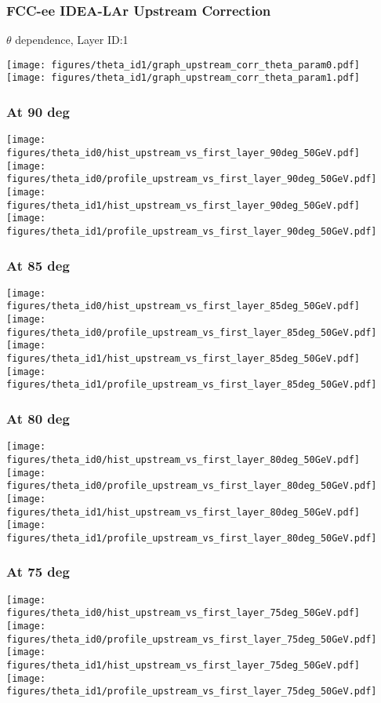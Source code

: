 \documentclass{beamer}
\newcommand{\redtext}[1]{%
  \textcolor{myRed}{#1}
}
\begin{document}
\begin{frame}
  \frametitle{FCC-ee IDEA-LAr Upstream Correction}

  \begin{center}
    $\theta$ dependence, Layer \redtext{ID:\@ 1}
  \end{center}

  \texttt{[image: figures/theta\_id1/graph\_upstream\_corr\_theta\_param0.pdf]}
  \texttt{[image: figures/theta\_id1/graph\_upstream\_corr\_theta\_param1.pdf]}
\end{frame}

\begin{frame}
  \frametitle{At 90 deg}
  \centering
  \texttt{[image: figures/theta\_id0/hist\_upstream\_vs\_first\_layer\_90deg\_50GeV.pdf]}
  \texttt{[image: figures/theta\_id0/profile\_upstream\_vs\_first\_layer\_90deg\_50GeV.pdf]} \\
  \texttt{[image: figures/theta\_id1/hist\_upstream\_vs\_first\_layer\_90deg\_50GeV.pdf]}
  \texttt{[image: figures/theta\_id1/profile\_upstream\_vs\_first\_layer\_90deg\_50GeV.pdf]}
\end{frame}

\begin{frame}
  \frametitle{At 85 deg}
  \centering
  \texttt{[image: figures/theta\_id0/hist\_upstream\_vs\_first\_layer\_85deg\_50GeV.pdf]}
  \texttt{[image: figures/theta\_id0/profile\_upstream\_vs\_first\_layer\_85deg\_50GeV.pdf]} \\
  \texttt{[image: figures/theta\_id1/hist\_upstream\_vs\_first\_layer\_85deg\_50GeV.pdf]}
  \texttt{[image: figures/theta\_id1/profile\_upstream\_vs\_first\_layer\_85deg\_50GeV.pdf]}
\end{frame}

\begin{frame}
  \frametitle{At 80 deg}
  \centering
  \texttt{[image: figures/theta\_id0/hist\_upstream\_vs\_first\_layer\_80deg\_50GeV.pdf]}
  \texttt{[image: figures/theta\_id0/profile\_upstream\_vs\_first\_layer\_80deg\_50GeV.pdf]} \\
  \texttt{[image: figures/theta\_id1/hist\_upstream\_vs\_first\_layer\_80deg\_50GeV.pdf]}
  \texttt{[image: figures/theta\_id1/profile\_upstream\_vs\_first\_layer\_80deg\_50GeV.pdf]}
\end{frame}

\begin{frame}
  \frametitle{At 75 deg}
  \centering
  \texttt{[image: figures/theta\_id0/hist\_upstream\_vs\_first\_layer\_75deg\_50GeV.pdf]}
  \texttt{[image: figures/theta\_id0/profile\_upstream\_vs\_first\_layer\_75deg\_50GeV.pdf]} \\
  \texttt{[image: figures/theta\_id1/hist\_upstream\_vs\_first\_layer\_75deg\_50GeV.pdf]}
  \texttt{[image: figures/theta\_id1/profile\_upstream\_vs\_first\_layer\_75deg\_50GeV.pdf]}
\end{frame}
\end{document}
